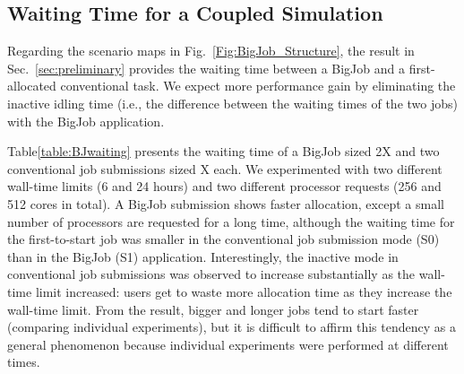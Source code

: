 \documentclass[preprint,12pt]{elsarticle}
\begin{document}
\subsection{Waiting Time for a Coupled Simulation}

Regarding the scenario maps in Fig.~\ref{Fig:BigJob_Structure}, the result in Sec.~\ref{sec:preliminary} provides the waiting time between a BigJob and a first-allocated conventional task. We expect more performance gain by eliminating the inactive idling time (i.e., the difference between the waiting times of the two jobs) with the BigJob application. 


Table\ref{table:BJwaiting}  presents the waiting time of a BigJob sized 2X and two conventional job submissions sized X each. We experimented with two different wall-time limits (6 and 24 hours) and two different processor requests (256 and 512 cores in total). A BigJob submission shows faster allocation, except a small number of processors are requested for a long time, although the waiting time for the first-to-start job was smaller in the conventional job submission mode (S0) than in the BigJob (S1) application. Interestingly, the inactive mode in conventional job submissions was observed to increase substantially as the wall-time limit increased: users get to waste more allocation time as they increase the wall-time limit. From the result, bigger and longer jobs tend to start faster (comparing individual experiments), but it is difficult to affirm this tendency as a general phenomenon because individual experiments were performed at different times.
\end{document}
